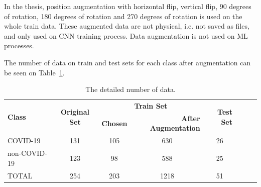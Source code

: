 In the thesis, position augmentation with horizontal flip, vertical flip, 90 degrees of rotation, 180 degrees of rotation and 270 degrees of rotation is used on the whole train data. These augmented data are not physical, i.e. not saved as files, and only used on CNN training process. Data augmentation is not used on ML processes.

The number of data on train and test sets for each class after augmentation can be seen on Table~\ref{tab:final_dataset_size}.


\begin{table}[h]
{
    \setlength{\tabcolsep}{14pt}
    \caption{The detailed number of data.}
    \begin{center}
    \begin{tabular}{lccrrrrr}
    \hline\hline
    \multirow{2}{*}{\textbf{Class}} & \multirow{2}{*}{\textbf{Original Set}} & \multicolumn{2}{c}{\textbf{Train Set}} & \multirow{2}{*}{\textbf{Test Set}} \\ \cline{3-4}
                           &                               & \textbf{Chosen}  & \textbf{After Augmentation}  &    \\
    \hline
    COVID-19           & 131                           & 105     & \multicolumn{1}{c}{630} & \multicolumn{1}{c}{26} \\
    non-COVID-19               & 123                           & 98      & \multicolumn{1}{c}{588} & \multicolumn{1}{c}{25} \\
    TOTAL                  & 254                           & 203     & \multicolumn{1}{c}{1218} & \multicolumn{1}{c}{51} \\   
    \hline
    \end{tabular}
    \end{center}
    \label{tab:final_dataset_size}
}
\end{table}

